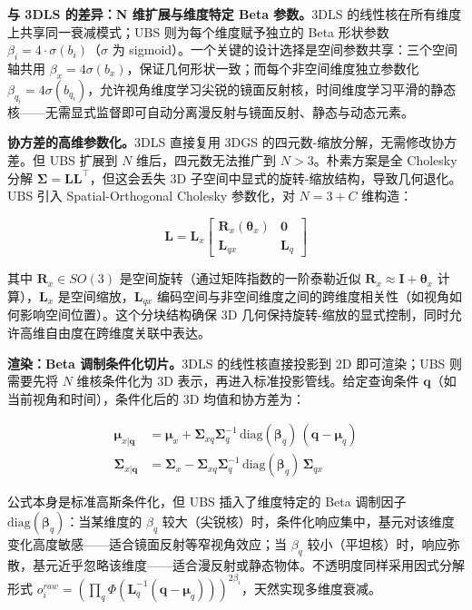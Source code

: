 \textbf{与 3DLS 的差异：N 维扩展与维度特定 Beta 参数。}3DLS 的线性核在所有维度上共享同一衰减模式；UBS 则为每个维度赋予独立的 Beta 形状参数 $\beta_i = 4 \cdot \sigma(b_i)$（$\sigma$ 为 sigmoid）。一个关键的设计选择是空间参数共享：三个空间轴共用 $\beta_x = 4\sigma(b_x)$，保证几何形状一致；而每个非空间维度独立参数化 $\beta_{q_i} = 4\sigma(b_{q_i})$，允许视角维度学习尖锐的镜面反射核，时间维度学习平滑的静态核——无需显式监督即可自动分离漫反射与镜面反射、静态与动态元素。

\textbf{协方差的高维参数化。}3DLS 直接复用 3DGS 的四元数-缩放分解，无需修改协方差。但 UBS 扩展到 $N$ 维后，四元数无法推广到 $N > 3$。朴素方案是全 Cholesky 分解 $\boldsymbol{\Sigma} = \mathbf{L}\mathbf{L}^\top$，但这会丢失 3D 子空间中显式的旋转-缩放结构，导致几何退化。UBS 引入 Spatial-Orthogonal Cholesky 参数化，对 $N = 3 + C$ 维构造：

\begin{equation}
\mathbf{L} = \mathbf{L}_x \begin{bmatrix} \mathbf{R}_x(\boldsymbol{\theta}_x) & \mathbf{0} \\ \mathbf{L}_{qx} & \mathbf{L}_q \end{bmatrix}
\end{equation}

其中 $\mathbf{R}_x \in SO(3)$ 是空间旋转（通过矩阵指数的一阶泰勒近似 $\mathbf{R}_x \approx \mathbf{I} + \boldsymbol{\theta}_x$ 计算），$\mathbf{L}_x$ 是空间缩放，$\mathbf{L}_{qx}$ 编码空间与非空间维度之间的跨维度相关性（如视角如何影响空间位置）。这个分块结构确保 3D 几何保持旋转-缩放的显式控制，同时允许高维自由度在跨维度关联中表达。

\textbf{渲染：Beta 调制条件化切片。}3DLS 的线性核直接投影到 2D 即可渲染；UBS 则需要先将 $N$ 维核条件化为 3D 表示，再进入标准投影管线。给定查询条件 $\mathbf{q}$（如当前视角和时间），条件化后的 3D 均值和协方差为：

\begin{align}
\boldsymbol{\mu}_{x|\mathbf{q}} &= \boldsymbol{\mu}_x + \boldsymbol{\Sigma}_{xq}\boldsymbol{\Sigma}_q^{-1} \, \text{diag}(\boldsymbol{\beta}_q) \, (\mathbf{q} - \boldsymbol{\mu}_q) \\
\boldsymbol{\Sigma}_{x|\mathbf{q}} &= \boldsymbol{\Sigma}_x - \boldsymbol{\Sigma}_{xq}\boldsymbol{\Sigma}_q^{-1} \, \text{diag}(\boldsymbol{\beta}_q) \, \boldsymbol{\Sigma}_{qx}
\end{align}

公式本身是标准高斯条件化，但 UBS 插入了维度特定的 Beta 调制因子 $\text{diag}(\boldsymbol{\beta}_q)$：当某维度的 $\beta_q$ 较大（尖锐核）时，条件化响应集中，基元对该维度变化高度敏感——适合镜面反射等窄视角效应；当 $\beta_q$ 较小（平坦核）时，响应弥散，基元近乎忽略该维度——适合漫反射或静态物体。不透明度同样采用因式分解形式 $o_i^{raw} = \left(\prod_{q} \Phi(\mathbf{L}_q^{-1}(\mathbf{q}-\boldsymbol{\mu}_q))\right)^{2\beta_i}$，天然实现多维度衰减。

